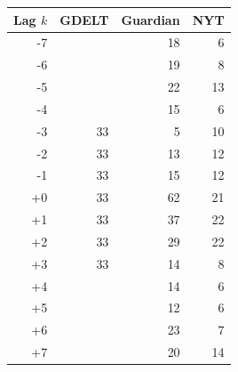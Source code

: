 \begin{tabular}{rrrr}
\toprule
Lag $k$ & GDELT & Guardian & NYT \\
\midrule
-7 &  & 18 & 6 \\
-6 &  & 19 & 8 \\
-5 &  & 22 & 13 \\
-4 &  & 15 & 6 \\
-3 & 33 & 5 & 10 \\
-2 & 33 & 13 & 12 \\
-1 & 33 & 15 & 12 \\
+0 & 33 & 62 & 21 \\
+1 & 33 & 37 & 22 \\
+2 & 33 & 29 & 22 \\
+3 & 33 & 14 & 8 \\
+4 &  & 14 & 6 \\
+5 &  & 12 & 6 \\
+6 &  & 23 & 7 \\
+7 &  & 20 & 14 \\
\bottomrule
\end{tabular}